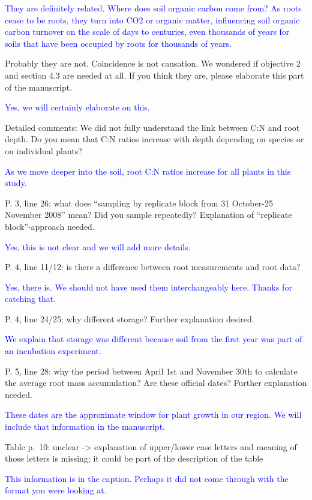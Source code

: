 \documentclass[]{article}
\begin{document}
\textcolor{blue}{They are definitely related. Where does soil organic carbon come from? As roots cease to be roots, they turn into CO2 or organic matter, influencing soil organic carbon turnover on the scale of days to centuries, even thousands of years for soils that have been occupied by roots for thousands of years.}

Probably they are not. Coincidence is not causation. We wondered if
objective 2 and section 4.3 are needed at all. If you think they are,
please elaborate this part of the manuscript.

\textcolor{blue}{Yes, we will certainly elaborate on this.}

Detailed comments: We did not fully understand the link between C:N and
root depth. Do you mean that C:N ratios increase with depth depending on
species or on individual plants?

\textcolor{blue}{As we move deeper into the soil, root C:N ratios increase for all plants in this study.}

P. 3, line 26: what does ``sampling by replicate block from 31
October-25 November 2008'' mean? Did you sample repeatedly? Explanation
of ``replicate block''-approach needed.

\textcolor{blue}{Yes, this is not clear and we will add more details.}

P. 4, line 11/12: is there a difference between root measurements and
root data?

\textcolor{blue}{Yes, there is. We should not have used them interchangeably here. Thanks for catching that.}

P. 4, line 24/25: why different storage? Further explanation desired.

\textcolor{blue}{We explain that storage was different because soil from the first year was part of an incubation experiment.}

P. 5, line 28: why the period between April 1st and November 30th to
calculate the average root mass accumulation? Are these official dates?
Further explanation needed.

\textcolor{blue}{These dates are the approximate window for plant growth in our region. We will include that information in the manuscript.}

Table p.~10: unclear -\textgreater{} explanation of upper/lower case
letters and meaning of those letters is missing; it could be part of the
description of the table

\textcolor{blue}{This information is in the caption. Perhaps it did not come through with the format you were looking at.}
\end{document}
